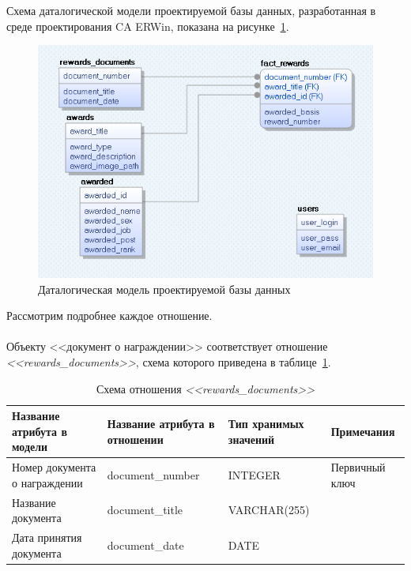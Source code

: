 Схема даталогической модели проектируемой базы данных, разработанная в среде проектирования CA ERWin, 
показана на рисунке~\ref{fig:er_physical}.

\begin{figure}[h]
  \centering
  \includegraphics[width=150mm]{pic/er_physical.png}
  \caption{Даталогическая модель проектируемой базы данных}
  \label{fig:er_physical}
\end{figure}

Рассмотрим подробнее каждое отношение.

\paragraph{}
Объекту <<документ о награждении>> соответствует отношение \textit{<<rewards\_documents>>},
схема которого приведена в таблице~\ref{tbl:rewards_documents_scheme}.

\begin{table}[h!]
  \caption{Схема отношения \textit{<<rewards\_documents>>}}
  \label{tbl:rewards_documents_scheme}
  \small{
    \centering
    \begin{tabular}{| p{} | p{} | p{} | p{} |}
      \hline
      Название атрибута \newline в модели &
      Название атрибута \newline в отношении &
      Тип хранимых \newline значений &
      Примечания \\ \hline

      Номер документа \newline о награждении &
      document\_number &
      INTEGER & Первичный ключ \\
      \hline

      Название документа &
      document\_title &
      VARCHAR(255) & \\
      \hline

      Дата принятия документа &
      document\_date &
      DATE & \\
      \hline

    \end{tabular}
  }
\end{table}

